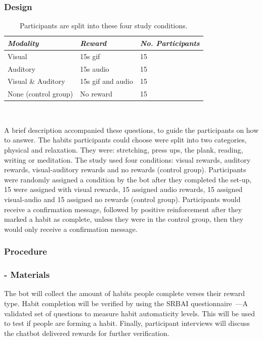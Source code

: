 \documentclass{scaffold/sigchi}
\begin{document}
\subsubsection{Design}


\begin{table}
  \centering
  \begin{tabular}{l l l}
    {\small\textit{Modality}} & {\small \textit{Reward}} & {\small \textit{No. Participants}}\\
    \midrule
    Visual & 15s gif & 15 \\
    Auditory & 15s audio & 15 \\
    Visual \& Auditory & 15s gif and audio & 15 \\
    None (control group) & No reward & 15 \\
  \end{tabular}
  \caption{Participants are split into these four study conditions.}~\label{tab:precise_rewards}
\end{table}

A brief description accompanied these questions, to guide the participants on how to answer. The habits participants could choose were split into two categories, physical and relaxation. They were: stretching, press ups, the plank, reading, writing or meditation.\newline
\newline
The study used four conditions: visual rewards, auditory rewards, visual-auditory rewards and no rewards (control group). Participants were randomly assigned a condition by the bot after they completed the set-up, 15 were assigned with visual rewards, 15 assigned audio rewards, 15 assigned visual-audio and 15 assigned no rewards (control group).\newline
\newline
Participants would receive a confirmation message, followed by positive reinforcement after they marked a habit as complete, unless they were in the control group, then they would only receive a confirmation message.


\subsubsection{Procedure}

\subsubsection{- Materials}
The bot will collect the amount of habits people complete verses their reward type. Habit completion will be verified by using the SRBAI questionnaire~\cite{article_habit_measurement}---A validated set of questions to measure habit automaticity levels. This will be used to test if people are forming a habit. Finally, participant interviews will discuss the chatbot delivered rewards for further verification.
\end{document}
